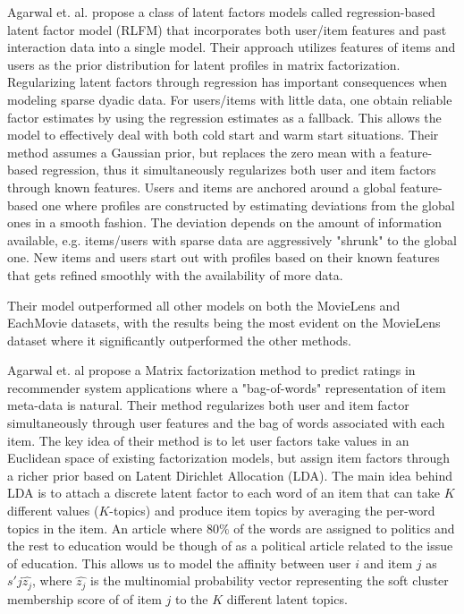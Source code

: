 Agarwal et. al. \cite{Agarwal2009} propose a class of latent factors models called regression-based latent factor model (RLFM) that incorporates both user/item features and past interaction data into a single model. Their approach utilizes features of items and users as the
prior distribution for latent profiles in matrix factorization. Regularizing latent factors through regression has important consequences when modeling sparse dyadic data. For users/items with little data, one obtain reliable factor estimates by using the regression estimates as a fallback. This allows the model to effectively deal with both cold start and warm start situations. Their method assumes a Gaussian prior, but replaces the zero mean with a feature-based regression, thus it simultaneously regularizes both user and item factors through known features. Users and items are anchored around a global feature-based one where profiles are constructed by estimating deviations from the global ones in a smooth fashion. The deviation depends on the amount of information available, e.g. items/users with sparse data are aggressively "shrunk" to the global one. New items and users start out with profiles based on their known features that gets refined smoothly with the availability of more data.

Their model outperformed all other models on both the MovieLens and EachMovie datasets, with the results being the most evident on the MovieLens dataset where it significantly outperformed the other methods.


Agarwal et. al \cite{Agarwal2010} propose a Matrix factorization method to predict ratings in recommender system
applications where a "bag-of-words" representation of item meta-data is natural. Their method regularizes both user and item factor simultaneously through user features and the bag of words associated with each item. The key idea of their method is to let user factors take values in an Euclidean space of existing factorization models, but assign item factors through a richer prior based on Latent Dirichlet Allocation (LDA). The main idea behind LDA is to attach a discrete latent factor to each word of an item that can take $K$ different values ($K$-topics) and produce item topics by averaging the per-word topics in the item. An article where 80$\%$ of the words are assigned to politics and the rest to education would be though of as a political article related to the issue of education. This allows us to model the affinity between user $i$ and item $j$ as $s'{j}\hat{z_{j}}$, where $\hat{z_{j}}$ is the multinomial probability vector representing the soft cluster membership score of of item $j$ to the $K$ different latent topics. 


